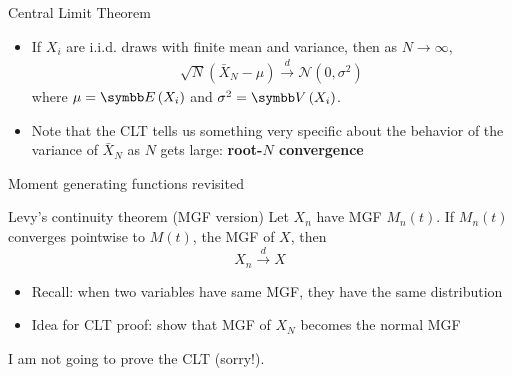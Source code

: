\documentclass[aspectratio=169,11pt]{beamer}
\begin{document}



\begin{frame}{Central Limit Theorem}
\begin{itemize}
	\item If $X_i$ are i.i.d. draws with finite mean and variance, then as $N\rightarrow \infty$,
	\begin{align*}
		\sqrt{N} \left( \bar{X}_N  - \mu\right) \overset{d}{\rightarrow} \mathcal{N}\left(0,\sigma^2\right) 
	\end{align*}
	where $\mu=\E\left(X_i\right)$ and $\sigma^2 = \Var\left(X_i\right)$.

	\medskip
	\item Note that the CLT tells us something very specific about the behavior of
			the variance of $\bar{X}_N$ as $N$ gets large: {\bf root-$N$ convergence}
\end{itemize}
\end{frame}




\begin{frame}{Moment generating functions revisited}
\begin{center}
\begin{minipage}{.8\textwidth}
	\begin{block}{Levy's continuity theorem (MGF version)}
	Let $X_n$ have MGF $M_n\left(t\right)$. If  $M_n\left(t\right)$ 
 	converges pointwise to $M\left(t\right)$, the MGF of $X$, then\[
	X_n \overset{d}{\rightarrow} X
	\]
	
	\end{block}
\end{minipage}

\begin{itemize}
	\item Recall: when two variables have same MGF, they have the same distribution
	\item Idea for CLT proof: show that MGF of $X_{N}$ becomes the normal MGF
\end{itemize}
\end{center}
I am not going to prove the CLT (sorry!).
\end{frame}
\end{document}
